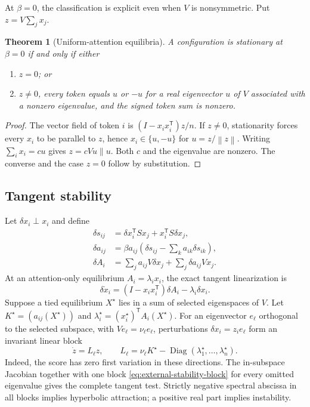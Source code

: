 \documentclass[11pt,a4paper]{article}
\newtheorem{theorem}{Theorem}[section]
\theoremstyle{definition}
\newcommand{\T}{\mathsf T}
\newcommand{\norm}[1]{\left\lVert #1\right\rVert}
\begin{document}
At $\beta=0$, the classification is explicit even when $V$ is nonsymmetric.  Put
$z=V\sum_jx_j$.

\begin{theorem}[Uniform-attention equilibria]
\label{thm:uniform-equilibria}
A configuration is stationary at $\beta=0$ if and only if either
\begin{enumerate}
 \item $z=0$; or
 \item $z\ne0$, every token equals $u$ or $-u$ for a real eigenvector $u$ of $V$
 associated with a nonzero eigenvalue, and the signed token sum is nonzero.
\end{enumerate}
\end{theorem}

\begin{proof}
The vector field of token $i$ is $(I-x_ix_i^{\T})z/n$.  If $z\ne0$, stationarity
forces every $x_i$ to be parallel to $z$, hence $x_i\in\{u,-u\}$ for
$u=z/\norm z$.  Writing $\sum_ix_i=cu$ gives $z=cVu\parallel u$.  Both $c$ and the
eigenvalue are nonzero.  The converse and the case $z=0$ follow by substitution.
\end{proof}

\subsection{Tangent stability}

Let $\delta x_i\perp x_i$ and define
\begin{align}
 \delta s_{ij}&=\delta x_i^{\T}Sx_j+x_i^{\T}S\delta x_j,\\
 \delta a_{ij}&=\beta a_{ij}\left(\delta s_{ij}
 -\sum_k a_{ik}\delta s_{ik}\right),\\
 \delta A_i&=\sum_j a_{ij}V\delta x_j+\sum_j\delta a_{ij}Vx_j.
 \label{eq:attention-variation}
\end{align}
At an attention-only equilibrium $A_i=\lambda_i x_i$, the exact tangent
linearization is
\begin{equation}
 \delta\dot x_i=(I-x_ix_i^{\T})\delta A_i-\lambda_i\delta x_i.
 \label{eq:attention-jacobian}
\end{equation}
Suppose a tied equilibrium $X^\star$ lies in a sum of selected eigenspaces of $V$.
Let $K^\star=(a_{ij}(X^\star))$ and
$\lambda_i^\star=(x_i^\star)^{\T}A_i(X^\star)$.  For an eigenvector $e_\ell$
orthogonal to the selected subspace, with $Ve_\ell=\nu_\ell e_\ell$, perturbations
$\delta x_i=z_i e_\ell$ form an invariant linear block
\begin{equation}
 \dot z=L_\ell z,\qquad
 L_\ell=\nu_\ell K^\star-
 \operatorname{Diag}(\lambda_1^\star,\ldots,\lambda_n^\star).
 \label{eq:external-stability-block}
\end{equation}
Indeed, the score has zero first variation in these directions.  The in-subspace
Jacobian together with one block \eqref{eq:external-stability-block} for every omitted
eigenvalue gives the complete tangent test.  Strictly negative spectral abscissa in
all blocks implies hyperbolic attraction; a positive real part implies instability.
\end{document}
